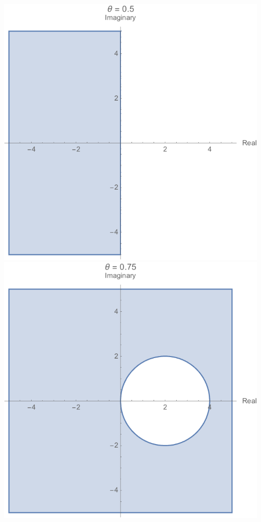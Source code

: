 \documentclass[11pt, oneside, titlepage]{article}
\begin{document}
\begin{enumerate}
\begin{enumerate}
\begin{center}
                   \includegraphics[scale=.3]{Figures/04_3_3.png}
                   \includegraphics[scale=.3]{Figures/04_3_4.png}

\end{center}
\end{enumerate}
\end{enumerate}
\end{document}
